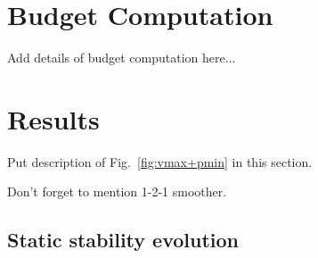\documentclass{ametsoc}
\begin{document}
 \section{Budget Computation}

Add details of budget computation here...

 \section{Results}

Put description of Fig.~\ref{fig:vmax+pmin} in this section. 

Don't forget to mention 1-2-1 smoother.

 \subsection{Static stability evolution}
\end{document}
